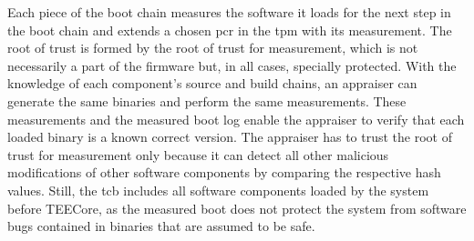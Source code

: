 Each piece of the boot chain measures the software it loads for the next step in
the boot chain and extends a chosen \gls{pcr} in the \gls{tpm} with its
measurement. The root of trust is formed by the root of trust for measurement,
which is not necessarily a part of the firmware but, in all cases, specially
protected. With the knowledge of each component's source and build chains, an
appraiser can generate the same binaries and perform the same measurements.
These measurements and the measured boot log enable the appraiser to verify that
each loaded binary is a known correct version. The appraiser has to trust the
root of trust for measurement only because it can detect all other malicious
modifications of other software components by comparing the respective hash
values. Still, the \gls{tcb} includes all software components loaded by the
system before TEECore, as the measured boot does not protect the system from
software bugs contained in binaries that are assumed to be safe.

